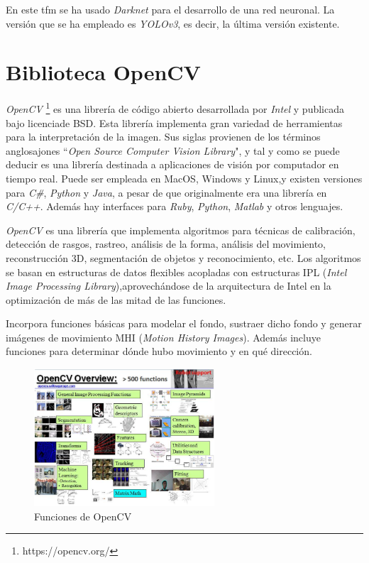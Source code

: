 En este \acrshort{tfm} se ha usado \textit{Darknet} para el desarrollo de una red neuronal. La versión que se ha empleado es \textit{YOLOv3}, es decir, la última versión existente.

\section{Biblioteca OpenCV}

\textit{OpenCV} \footnote{https://opencv.org/} es una librería de código abierto desarrollada por \textit{Intel} y publicada  bajo licenciade BSD. Esta librería implementa gran variedad de herramientas para la interpretación de la imagen. Sus  siglas  provienen  de  los  términos anglosajones ``\textit{Open Source Computer  Vision Library}", y tal y como se puede deducir es una librería destinada a aplicaciones de visión por computador en tiempo real. Puede ser empleada en MacOS, Windows y Linux,y existen versiones para \textit{C\#}, \textit{Python} y \textit{Java}, a pesar de que originalmente era una librería en \textit{C/C++}. Además hay interfaces para \textit{Ruby}, \textit{Python}, \textit{Matlab} y otros lenguajes. 

\textit{OpenCV} es una librería que implementa algoritmos para técnicas de calibración, detección de rasgos, rastreo, análisis de la forma, análisis del movimiento, reconstrucción 3D, segmentación de objetos y reconocimiento, etc. Los algoritmos se basan  en  estructuras de datos flexibles acopladas con estructuras IPL  (\textit{Intel  Image Processing Library}),aprovechándose de la arquitectura de Intel en la optimización de más de las mitad de las funciones.

Incorpora funciones básicas para modelar el fondo, sustraer dicho  fondo y generar imágenes de movimiento MHI  (\textit{Motion  History  Images}).  Además  incluye  funciones para determinar dónde hubo movimiento y en qué dirección. 

\begin{figure}[H]
  \begin{center}
    \includegraphics[width=0.6\textwidth]{figures/Herramientas/opencv.png}
		\caption{Funciones de OpenCV}
		\label{fig.opencv}
		\end{center}
\end{figure}

